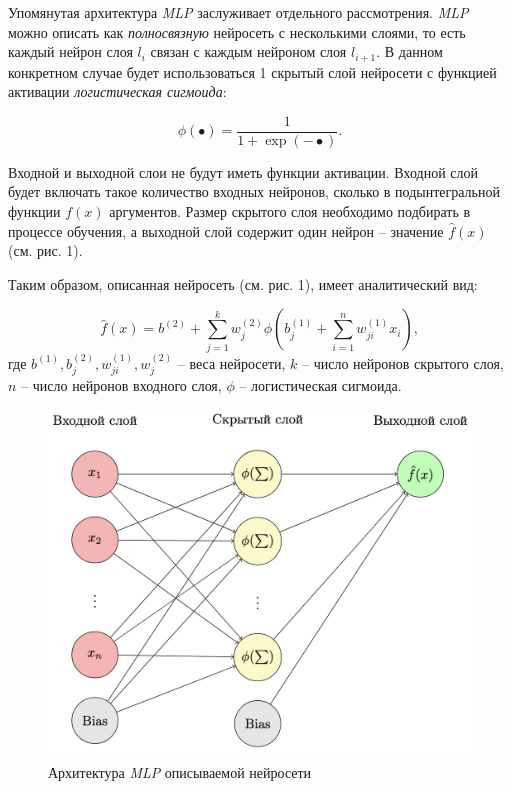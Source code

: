 \documentclass[a4paper,12pt]{article} %
\renewcommand{\figurename}{Рисунок\_}
\begin{document}
Упомянутая архитектура \textit{MLP} заслуживает отдельного рассмотрения.  \textit{MLP} можно описать как \textit{полносвязную} нейросеть с несколькими слоями, то есть каждый нейрон слоя $l_i$ связан с каждым нейроном слоя $l_{i+1}$. В данном конкретном случае будет использоваться 1 скрытый слой нейросети с функцией активации \textit{логистическая сигмоида}: 

\begin{equation}
    \phi(•) = \frac{1}{1+\exp(-•)}.
\end{equation}
    
Входной и выходной слои не будут иметь функции активации. Входной слой будет включать такое количество входных нейронов, сколько в подынтегральной функции $f(x)$ аргументов. Размер скрытого слоя необходимо подбирать в процессе обучения, а выходной слой содержит один нейрон -- значение $\hat{f}(x)$ (см. рис. 1).

Таким образом, описанная нейросеть (см. рис. 1), имеет аналитический вид:

\begin{equation}
\hat{f}(x) = b^{(2)} + \sum_{j=1}^{k}w_j^{(2)}\phi(b_j^{(1)}+\sum_{i=1}^{n}w_{ji}^{(1)}x_{i}),
\end{equation}
где $b^{(1)}, b_j^{(2)}, w_{ji}^{(1)}, w_j^{(2)}$ -- веса нейросети, $k$ -- число нейронов скрытого слоя, $n$ -- число нейронов входного слоя, $\phi$ -- логистическая сигмоида.

\renewcommand{\figurename}{Рисунок}
\renewcommand{\thefigure}{1}
\begin{figure}
    \centering
    \includegraphics[width=0.75\linewidth]{architecture.png}
    \caption{Архитектура \textit{MLP} описываемой нейросети}
    \label{fig:enter-label}
\end{figure}
\end{document}
